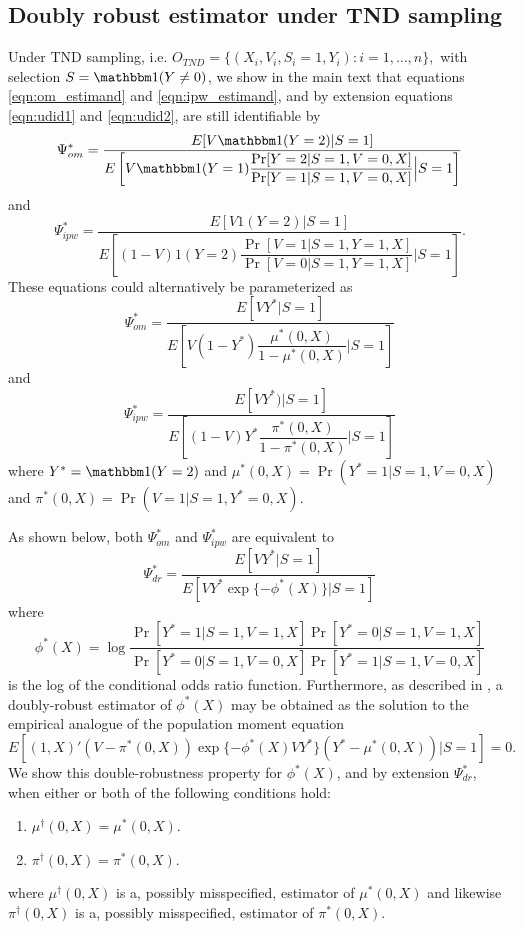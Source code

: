 \begin{appendix}
\begin{refsection}
\section{Doubly robust estimator under TND sampling}\label{sec:eif}
Under TND sampling, i.e. $O_{TND} = \{(X_i, V_i, S_i=1, Y_i) : i = 1, \ldots, n\},$ with selection $S = \mathbbm 1(Y\neq 0)$, 
we show in the main text that equations \ref{eqn:om_estimand} and \ref{eqn:ipw_estimand}, and by extension equations \ref{eqn:udid1} and \ref{eqn:udid2}, are still identifiable by
    \begin{equation*}
        \Psi_{om}^* = \dfrac{E[V \mathbbm 1 (Y = 2)|S =1]}{E\left[V\mathbbm 1 (Y = 1) \dfrac{\Pr[Y = 2 | S = 1, V = 0, X]}{\Pr[Y = 1| S = 1, V = 0, X]}\Big| S = 1 \right]}
    \end{equation*}
    and 
     \begin{equation*}
        \Psi_{ipw}^* = \dfrac{E[V 1 (Y = 2)|S =1]}{E\left[ (1 - V) 1 (Y = 2) \dfrac{\Pr[V=1 | S=1, Y=1, X]}{\Pr[V=0 | S=1, Y=1, X]} \bigg| S = 1\right]}.
    \end{equation*}
    These equations could alternatively be parameterized as 
    \begin{equation}\label{eqn:om_estimand_tnd_alt}
        \Psi_{om}^* = \dfrac{E[V Y^*|S =1]}{E\left[V(1-Y^*) \dfrac{\mu^*(0,X)}{1 - \mu^*(0,X)}\Big| S = 1 \right]}
    \end{equation}
    and 
    \begin{equation}\label{eqn:ipw_estimand_tnd_alt}
        \Psi_{ipw}^* = \dfrac{E[V Y^*)|S =1]}{E\left[ (1 - V) Y^* \dfrac{\pi^*(0,X)}{1 - \pi^*(0,X)} \bigg| S = 1\right]}
    \end{equation}
    where $Y^* = \mathbbm 1(Y= 2)$ and $\mu^*(0,X) = \Pr(Y^*=1|S=1,V=0,X)$ and $\pi^*(0,X) = \Pr(V=1 | S=1, Y^*=0, X)$. 
    
    As shown below, both $\Psi_{om}^*$ and $\Psi_{ipw}^*$ are equivalent to
    \[\Psi^*_{dr} = \dfrac{E[V Y^*|S =1]}{E\left[VY^*\exp\{-\phi^*(X)\}\Big| S = 1 \right]}\]
    where 
    \[\phi^*(X) = \log \dfrac{\Pr[Y^*=1|S=1, V=1,X]\Pr[Y^*=0|S=1, V=1,X]}{\Pr[Y^*=0|S=1, V=0,X]\Pr[Y^*=1|S=1, V=0,X]}\]
    is the log of the conditional odds ratio function. Furthermore, as described in \textcite{tchetgen_tchetgen_doubly_2010}, a doubly-robust estimator of $\phi^*(X)$ may be obtained as the solution to the empirical analogue of the population moment equation
    \[E[(1,X)'(V-\pi^*(0,X))\exp\{-\phi^*(X)VY^*\}(Y^* - \mu^*(0,X)) | S = 1] = 0.\]
    We show this double-robustness property for $\phi^*(X)$, and by extension $\Psi^*_{dr}$, when either or both of the following conditions hold:
    \begin{enumerate}
        \item $\mu^\dagger(0,X) = \mu^*(0,X)$.
        \item $ \pi^\dagger(0,X) = \pi^*(0,X)$.
    \end{enumerate}
    where  $\mu^\dagger(0,X)$ is a, possibly misspecified, estimator of $\mu^*(0,X)$ and likewise $\pi^\dagger(0,X)$ is a, possibly misspecified, estimator of $\pi^*(0,X)$.

\end{refsection}
\end{appendix}
